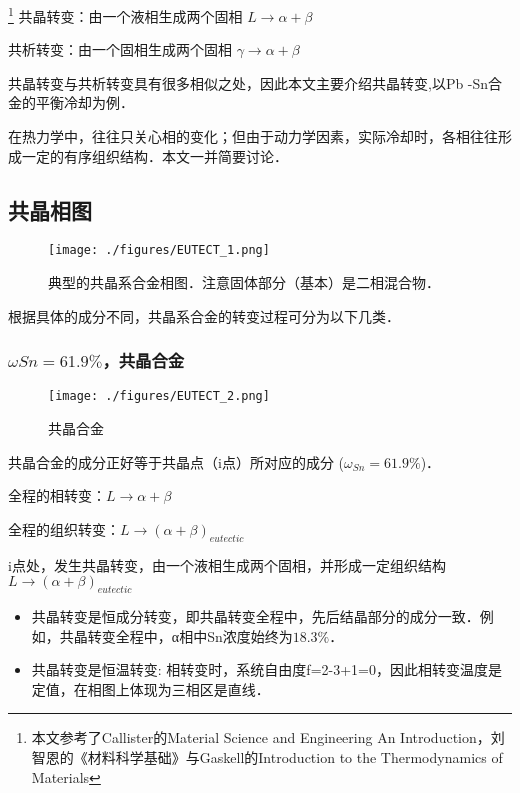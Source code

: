 
\footnote{本文参考了Callister的Material Science and Engineering An Introduction，刘智恩的《材料科学基础》与Gaskell的Introduction to the Thermodynamics of Materials}
共晶转变：由一个液相生成两个固相 $L \rightarrow \alpha+\beta$

共析转变：由一个固相生成两个固相 $\gamma \rightarrow \alpha+\beta$

共晶转变与共析转变具有很多相似之处，因此本文主要介绍共晶转变,以Pb
-Sn合金的平衡冷却为例．

在热力学中，往往只关心相的变化；但由于动力学因素，实际冷却时，各相往往形成一定的有序组织结构．本文一并简要讨论．

\subsection{共晶相图}
\begin{figure}[ht]
\centering
\texttt{[image: ./figures/EUTECT\_1.png]}
\caption{典型的共晶系合金相图．注意固体部分（基本）是二相混合物．} \label{EUTECT_fig1}
\end{figure}
根据具体的成分不同，共晶系合金的转变过程可分为以下几类．

\subsubsection{$\omega Sn=61.9\%$，共晶合金}
\begin{figure}[ht]
\centering
\texttt{[image: ./figures/EUTECT\_2.png]}
\caption{共晶合金} \label{EUTECT_fig2}
\end{figure}

共晶合金的成分正好等于共晶点（i点）所对应的成分 ($\omega_{Sn}=61.9\%$)．

全程的相转变：$L \rightarrow \alpha+\beta$

全程的组织转变：$L \rightarrow (\alpha+\beta)_{eutectic}$

i点处，发生共晶转变，由一个液相生成两个固相，并形成一定组织结构 $L \rightarrow (\alpha+\beta)_{eutectic}$
\begin{itemize}
\item 共晶转变是恒成分转变，即共晶转变全程中，先后结晶部分的成分一致．例如，共晶转变全程中，α相中Sn浓度始终为$18.3\%$．
\item 共晶转变是恒温转变: 相转变时，系统自由度f=2-3+1=0，因此相转变温度是定值，在相图上体现为三相区是直线．
\end{itemize}

